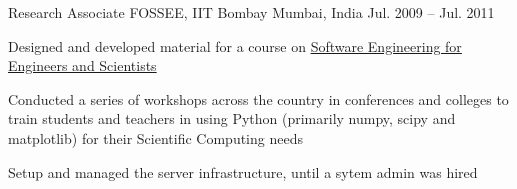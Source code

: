 \begin{cventries}
  \cventry
    {Research Associate} %
    {FOSSEE, IIT Bombay } %
    {Mumbai, India} %
    {Jul. 2009 -- Jul. 2011} %
    {
      \begin{cvitems} %
        \item {Designed and developed material for a course on \href{https://github.com/FOSSEE/sees}{Software Engineering for Engineers and Scientists}}
        \item {Conducted a series of workshops across the country in conferences and colleges to train students and teachers in using Python (primarily numpy, scipy and matplotlib) for their Scientific Computing needs}
        \item {Setup and managed the server infrastructure, until a sytem admin was hired}
      \end{cvitems}
    }

\end{cventries}
